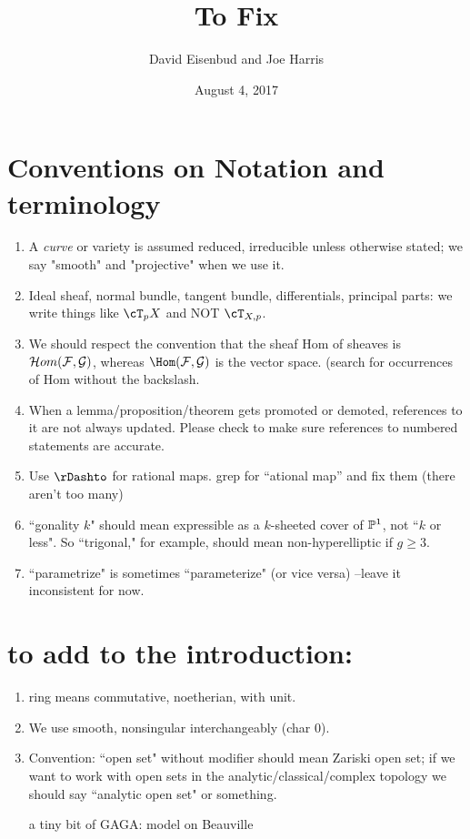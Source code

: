\documentclass[12pt, leqno]{book}
\date{August 4, 2017}
\title{To Fix}
\author{David Eisenbud and Joe Harris }
\begin{document}
\maketitle

\setlength{\parskip}{5pt}

 
 \section{Conventions on Notation and terminology}
\begin{enumerate}

\item A \emph{curve} or variety is assumed  reduced, irreducible unless otherwise stated; we say "smooth" and "projective" when we use it.

\item Ideal sheaf, normal bundle, tangent bundle, differentials, principal parts: we write things like 
$\cT_{p}X$ and NOT $\cT_{X,p}$.  

\item We should respect the convention that the sheaf Hom of sheaves is
$\cH om(\cF,\cG)$, whereas $\Hom(\cF,\cG)$ is the vector space. (search for occurrences of Hom without the backslash.

\item When a lemma/proposition/theorem gets promoted or demoted, references to it are not always updated. Please check to make sure references to numbered statements are accurate. 

\item Use $\rDashto$ for rational maps. grep for ``ational map'' and fix them (there aren't too many) 

\item ``gonality $k$" should mean expressible as a $k$-sheeted cover of $\PP^1$, not ``$k$ or less". So ``trigonal," for example, should mean non-hyperelliptic if $g \geq 3$.

\item ``parametrize" is sometimes ``parameterize" (or vice versa) --leave it inconsistent for now.

\end{enumerate}


\section {to add to the introduction:}
\begin{enumerate}
\item ring means commutative, noetherian, with unit.

\item We use smooth, nonsingular interchangeably (char 0).

\item Convention: ``open set" without modifier should mean Zariski open set; if we want to work with open sets in the analytic/classical/complex topology we should say ``analytic open set" or something. 

a tiny bit of GAGA: model on Beauville
 \end{enumerate}
 
\end{document}
